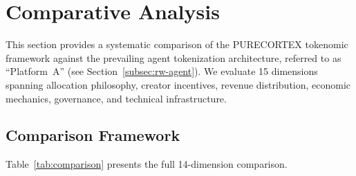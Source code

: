 \section{Comparative Analysis}
\label{sec:comparative}

This section provides a systematic comparison of the PURECORTEX tokenomic
framework against the prevailing agent tokenization architecture, referred to
as ``Platform~A'' (see Section~\ref{subsec:rw-agent}). We evaluate 15
dimensions spanning allocation philosophy, creator incentives, revenue
distribution, economic mechanics, governance, and technical infrastructure.

\subsection{Comparison Framework}
\label{subsec:comp-framework}

Table~\ref{tab:comparison} presents the full 14-dimension comparison.

